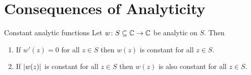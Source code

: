 \documentclass{article}
\begin{document}
    \section{Consequences of Analyticity}
    \begin{theorem}{Constant analytic functions}{}
        Let \(w\colon S\subseteq\mathbb{C}\to\mathbb{C}\) be analytic on \(S\).
        Then
        \begin{enumerate}[label=(\roman*)]
            \item If \(w'(z) = 0\) for all \(z\in S\) then \(w(z)\) is constant for all \(z \in S\).
            \item If \(\abs{w(z)}\) is constant for all \(z\in S\) then \(w(z)\) is also constant for all \(z\in S\).
        \end{enumerate}
    \end{theorem}
\end{document}
